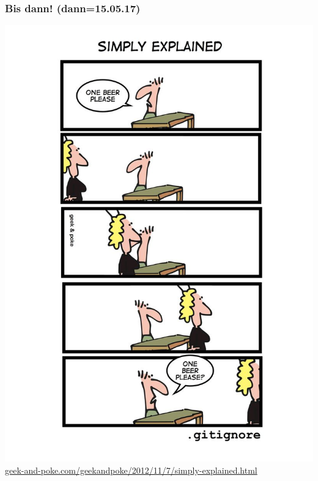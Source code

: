 \documentclass[18pt]{beamer}
\begin{document}
	\begin{frame}
		\frametitle{Bis dann! (dann=15.05.17)}
		\centering
		\includegraphics[height=0.85\textheight]{./comics/geek_and_poke_gitignore.jpg}
		\tiny\url{geek-and-poke.com/geekandpoke/2012/11/7/simply-explained.html}
	\end{frame}
\end{document}
